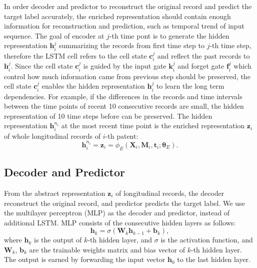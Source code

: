 In order decoder and predictor to reconstruct the original record and predict the target label accurately, the enriched representation should contain enough information for reconstruction and prediction, such as temporal trend of input sequence. The goal of encoder at $j$-th time pont is to generate the hidden representation $\mathbf{h}_i^j$ summarizing the records from first time step to $j$-th time step, therefore the LSTM cell refers to the cell state $\mathbf{c}_i^j$ and reflect the past records to $\mathbf{h}_i^j$. Since the cell state $\mathbf{c}_i^j$ is guided by the input gate $\mathbf{k}_i^j$ and forget gate $\mathbf{f}_i^j$ which control how much information came from previous step should be preserved, the cell state $\mathbf{c}_i^j$ enables the hidden representation $\mathbf{h}_i^j$ to learn the long term dependencies. For example, if the differences in the records and time intervals between the time points of recent 10 consecutive records are small, the hidden representation of 10 time steps before can be preserved.
The hidden representation $\mathbf{h}_i^{n_i}$ at the most recent time point is the enriched representation $\mathbf{z}_i$ of whole longitudinal records of $i$-th patent:
\begin{equation}
    \mathbf{h}_i^{n_i} = \mathbf{z}_i = \phi_E(\mathbf{X}_i, \mathbf{M}_i, \mathbf{t}_i; \mathbf{\theta}_E).
\end{equation}

\subsection{Decoder and Predictor}
From the abstract representation $\mathbf{z}_i$ of longitudinal records, the decoder reconstruct the original record, and predictor predicts the target label.
We use the multilayer perceptron (MLP) as the decoder and predictor, instead of additional LSTM. MLP consists of the consecutive hidden layers as follows:
\begin{equation}
    \mathbf{h}_k = \sigma(\mathbf{W}_k\mathbf{h}_{k-1} + \mathbf{b}_k),
\end{equation}
where $\mathbf{h}_k$ is the output of $k$-th hidden layer, and $\sigma$ is the activation function, and $\mathbf{W}_k$, $\mathbf{b}_k$ are the trainable weights matrix and bias vector of $k$-th hidden layer. The output is earned by forwarding the input vector $\mathbf{h}_0$ to the last hidden layer. 

